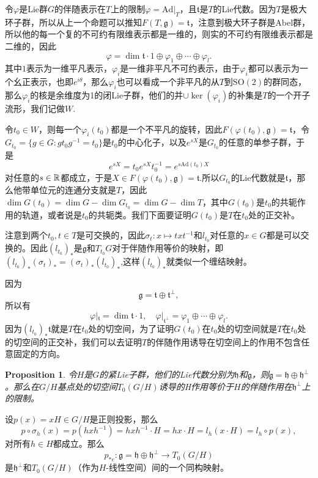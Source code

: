 \documentclass[9pt]{extbook}
\theoremstyle{plain}
\newtheorem{pro}[defi]{Proposition}
\newcommand{\lag}{{\mathfrak{g}}}  %
\begin{document}
令$\varphi$是Lie群$G$的伴随表示在$T$上的限制$\varphi=\mathrm{Ad}|_T$，且$\mathfrak{t}$是$T$的Lie代数。因为$T$是极大环子群，所以从上一个命题可以推知$F(T,\lag)=\mathfrak{t}$，注意到极大环子群是Abel群，所以他的每一个复的不可约有限维表示都是一维的，则实的不可约有限维表示都是二维的，因此
\[
\varphi=\dim \mathfrak{t}\cdot 1\oplus \varphi_1\oplus\cdots \oplus \varphi_l.
\]
其中$1$表示为一维平凡表示，$\varphi_i$是一维非平凡不可约表示，由于$\varphi_i$都可以表示为一个幺正表示，也即$e^{i\theta}$，那么$\varphi_i$也可以看成一个非平凡的从$T$到$\mathrm{SO}(2)$的群同态，那么$\varphi_i$的核是余维度为1的闭Lie子群，他们的并$\cup\ker(\varphi_i)$的补集是$T$的一个开子流形，我们记做$W$.

令$t_0\in W$，则每一个$\varphi_i(t_0)$都是一个不平凡的旋转，因此$F(\varphi(t_0),\lag)=\mathfrak{t}$，令$G_{t_0}=\{g\in G:gt_0g^{-1}=t_0\}$是$t_0$的中心化子，以及$e^{sX}$是$G_{t_0}$的任意的单参子群，于是
\[
	e^{sX}=t_0e^{sX}t_0^{-1}=e^{s\mathrm{Ad}(t_0)X}
\]
对任意的$s\in\mathbb{R}$都成立，于是$X\in F(\varphi(t_0),\lag)=\mathfrak{t}$.所以$G_{t_0}$的Lie代数就是$\mathfrak{t}$，那么他带单位元的连通分支就是$T$，因此$\dim G(t_0)=\dim G -\dim G_{t_0}=\dim G -\dim T$，其中$G(t_0)$是$t_0$的共轭作用的轨道，或者说是$t_0$的共轭类。我们下面要证明$G(t_0)$是$T$在$t_0$处的正交补。

注意到两个$t_0,t\in T$是可交换的，因此$\sigma_t:x\mapsto txt^{-1}$和$l_{t_0}$对任意的$x\in G$都是可以交换的。因此$(l_{t_0})_*$是$\lag$和$T_{t_0}G$对于伴随作用等价的映射，即$(l_{t_0})_*(\sigma_t)_*=(\sigma_t)_*(l_{t_0})_*$,这样$(l_{t_0})_*$就类似一个缠结映射。

因为
\[
\lag=\mathfrak{t}\oplus\mathfrak{t}^\bot,
\]
所以有
\[
\varphi|_\mathfrak{t}=\dim \mathfrak{t}\cdot 1,\quad \varphi|_{\mathfrak{t}^\bot}=\varphi_1\oplus\cdots \oplus \varphi_l.
\]
因为$(l_{t_0})_*\mathfrak{t}$就是$T$在$t_0$处的切空间，为了证明$G(t_0)$在$t_0$处的切空间就是$T$在$t_0$处的切空间的正交补，我们可以去证明$T$的伴随作用诱导在切空间上的作用不包含任意固定的方向。

\begin{pro}
令$H$是$G$的紧Lie子群，他们的Lie代数分别为$\mathfrak{h}$和$\lag$，则$\lag=\mathfrak{h}\oplus\mathfrak{h}^\bot$。那么在$G/H$基点处的切空间$T_0(G/H)$诱导的H作用等价于$H$的伴随作用在$\mathfrak{h}^\bot$上的限制。
\end{pro}
设$p(x)=xH\in G/H$是正则投影，那么
\[
p\circ \sigma_h(x)=p(hxh^{-1})=hxh^{-1}\cdot H=hx\cdot H=l_h(x\cdot H)=l_h\circ p(x),
\]
对所有$h\in H$都成立。那么
\[
p_{*e}:\lag=\mathfrak{h}\oplus\mathfrak{h}^\bot\to T_0(G/H)
\]
是$\mathfrak{h}^\bot$和$T_0(G/H)$（作为$H$-线性空间）间的一个同构映射。
\end{document}
